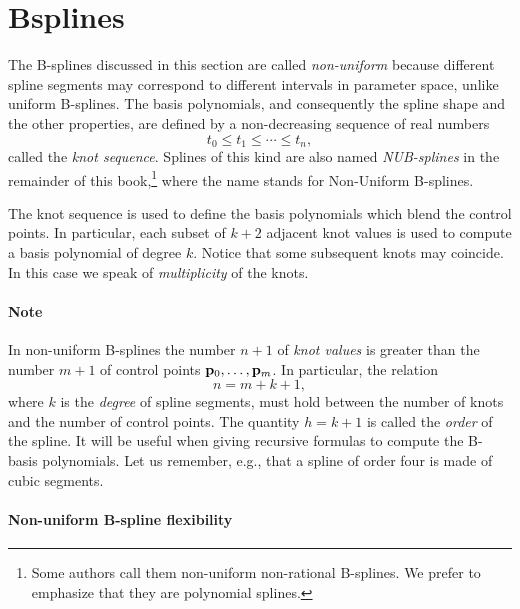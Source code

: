 \documentclass[11pt,oneside]{article}	%
\def\p#1{{\bf #1}}
\begin{document}
\section{Bsplines}
The B-splines discussed in this section are called \emph{non-uniform}
because different spline segments may correspond to different
intervals in parameter space, unlike uniform B-splines. 
The basis polynomials, and consequently the spline shape and the other
properties, are defined by a non-decreasing sequence of real
numbers
\[
t_0 \leq t_1 \leq\cdots\leq t_n,
\]
called the {\it knot sequence}.  Splines of this kind are also named
\emph{NUB-splines} in the remainder of this book,\footnote{Some authors
call them non-uniform non-rational B-splines.  We prefer to emphasize
that they are polynomial splines.} where the name stands for
Non-Uniform B-splines. 

The knot sequence is used to define the basis polynomials which blend
the control points.  In particular, each subset of $k+2$ adjacent knot
values is used to compute a basis polynomial of degree $k$.  Notice
that some subsequent knots may coincide.  In this case we speak of 
\emph{multiplicity} of the knots.


\paragraph{Note}

In non-uniform B-splines the number $n+1$ of {\em knot values} is
greater than the number $m+1$ of control points $\p{p}_0, \ldots,
\p{p}_m$.  In particular, the relation
\begin{equation}
	n = m+k+1,
	\label{eq:knotsNumber}
\end{equation}
where $k$ is the \emph{degree} of spline segments, must hold between
the number of knots and the number of control points.  The quantity $h
= k+1$ is called the \emph{order} of the spline.  It will be useful
when giving recursive formulas to compute the B-basis polynomials. 
Let us remember, e.g., that a spline of order four is made of cubic
segments.


\paragraph{Non-uniform B-spline flexibility}
\end{document}
